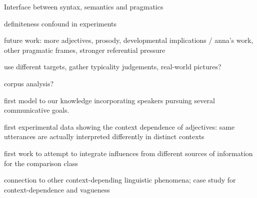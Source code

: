 Interface between syntax, semantics and pragmatics

definiteness confound in experiments

future work: more adjectives, prosody, developmental implications / anna's work, other pragmatic frames, stronger referential pressure

use different targets, gather typicality judgements, real-world pictures?

corpus analysis?

first model to our knowledge incorporating speakers pursuing several communicative goals. 

first experimental data showing the context dependence of adjectives: same utterances are actually interpreted differently in distinct contexts

first work to attempt to integrate influences from different sources of information for the comparison class


connection to other context-depending linguistic phenomena; case study for context-dependence and vagueness

